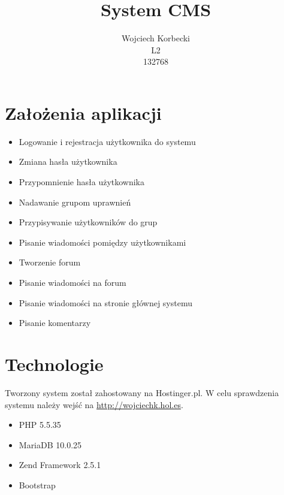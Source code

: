 \documentclass[12pt,oneside]{article}
\title{System CMS}
\author{Wojciech Korbecki\\ L2\\ 132768}
\date{}
\begin{document}
\clearpage\maketitle
\thispagestyle{empty}
\newpage
\tableofcontents

\section{Założenia aplikacji}
	\begin{itemize}
		\item Logowanie i rejestracja użytkownika do systemu
		\item Zmiana hasła użytkownika
		\item Przypomnienie hasła użytkownika
		\item Nadawanie grupom uprawnień
		\item Przypisywanie użytkowników do grup
		\item Pisanie wiadomości pomiędzy użytkownikami
		\item Tworzenie forum
		\item Pisanie wiadomości na forum
		\item Pisanie wiadomości na stronie głównej systemu
		\item Pisanie komentarzy
	\end{itemize}
\section{Technologie}
	Tworzony system został zahostowany na Hostinger.pl. W celu sprawdzenia systemu należy wejść na \url{http://wojciechk.hol.es}.
	\begin{itemize}
		\item PHP 5.5.35
		\item MariaDB 10.0.25
		\item Zend Framework 2.5.1
		\item Bootstrap
	\end{itemize}
\end{document}
